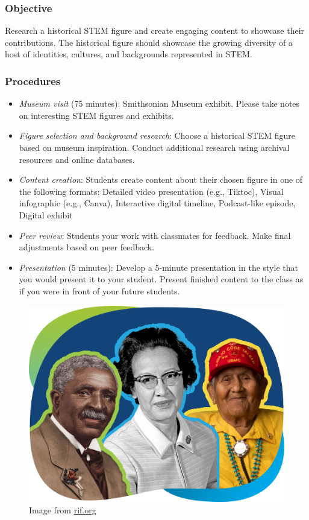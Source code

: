 \documentclass[
  letterpaper,
  DIV=11,
  numbers=noendperiod]{scrartcl}
\begin{document}
\subsubsection{Objective}\label{objective}

Research a historical STEM figure and create engaging content to
showcase their contributions. The historical figure should showcase the
growing diversity of a host of identities, cultures, and backgrounds
represented in STEM.

\subsubsection{Procedures}\label{procedures}

\begin{itemize}
\item
  \emph{Museum visit} (75 minutes): Smithsonian Museum exhibit. Please
  take notes on interesting STEM figures and exhibits.
\item
  \emph{Figure selection and background research}: Choose a historical
  STEM figure based on museum inspiration. Conduct additional research
  using archival resources and online databases.
\item
  \emph{Content creation}: Students create content about their chosen
  figure in one of the following formats: Detailed video presentation
  (e.g., Tiktoc), Visual infographic (e.g., Canva), Interactive digital
  timeline, Podcast-like episode, Digital exhibit
\item
  \emph{Peer review}: Students your work with classmates for feedback.
  Make final adjustments based on peer feedback.
\item
  \emph{Presentation} (5 minutes): Develop a 5-minute presentation in
  the style that you would present it to your student. Present finished
  content to the class as if you were in front of your future students.
\end{itemize}

\begin{figure}[H]

{\centering \includegraphics{../img/mod03/historical-figures.png}

}

\caption{Image from
\href{https://www.rif.org/literacy-central/sustainable-futures/careers-in-stem}{rif.org}}

\end{figure}%
\end{document}

